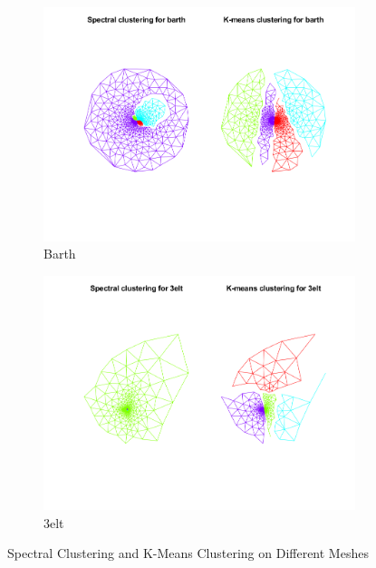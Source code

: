 \documentclass[unicode,11pt,a4paper,oneside,numbers=endperiod,openany]{scrartcl}
\begin{document}
\begin{figure}[H]
    \begin{subfigure}{0.45\textwidth}
        \centering
        \includegraphics[width=\linewidth]{figures/2.2_barth.png}
        \caption{Barth}
        \label{fig:barth-2.2}
    \end{subfigure}
    \hfill
    \begin{subfigure}{0.45\textwidth}
        \centering
        \includegraphics[width=\linewidth]{figures/2.2_3elt.png}
        \caption{3elt}
        \label{fig:3elt-2.2}
    \end{subfigure}
    \caption{Spectral Clustering and K-Means Clustering on Different Meshes}
    \label{fig:overall-2.2}
\end{figure}
\end{document}
